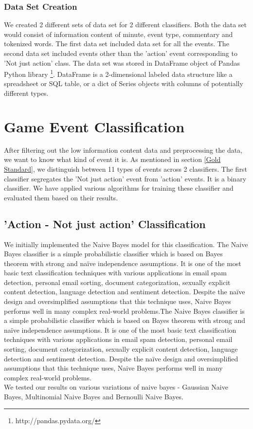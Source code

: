 \documentclass[11pt,letterpaper]{article}
\begin{document}
\subsubsection{Data Set Creation}
We created 2 different sets of data set for 2 different classifiers. Both the data set would consist of information content of minute, event type, commentary and tokenized words. The first data set included data set for all the events. The second data set included events other than the 'action' event corresponding to 'Not just action' class. The data set was stored in DataFrame object of Pandas Python library \footnote{http://pandas.pydata.org/}. DataFrame is a 2-dimensional labeled data structure like a spreadsheet or SQL table, or a dict of Series objects with columns of potentially different types.\\

\section{Game Event Classification}
After filtering out the low information content data and preprocessing the data, we want to know what kind of event it is. As mentioned in section \ref{Gold Standard}, we distinguish between 11 types of events across 2 classifiers. The first classifier segregates the 'Not just action' event from 'action' events. It is a binary classifier. We have applied various algorithms for training these classifier and evaluated them based on their results.\\
\subsection{'Action - Not just action' Classification} \label{'Action - Not just action' Classification}
We initially implemented the Naive Bayes model for this classification. The Naive Bayes classifier is a simple probabilistic classifier which is based on Bayes theorem with strong and naïve independence assumptions. It is one of the most basic text classification techniques with various applications in email spam detection, personal email sorting, document categorization, sexually explicit content detection, language detection and sentiment detection. Despite the naïve design and oversimplified assumptions that this technique uses, Naive Bayes performs well in many complex real-world problems.The Naive Bayes classifier is a simple probabilistic classifier which is based on Bayes theorem with strong and naïve independence assumptions. It is one of the most basic text classification techniques with various applications in email spam detection, personal email sorting, document categorization, sexually explicit content detection, language detection and sentiment detection. Despite the naïve design and oversimplified assumptions that this technique uses, Naive Bayes performs well in many complex real-world problems.\\
We tested our results on various variations of naive bayes - Gaussian Naive Bayes, Multinomial Naive Bayes and Bernoulli Naive Bayes. 
\end{document}
